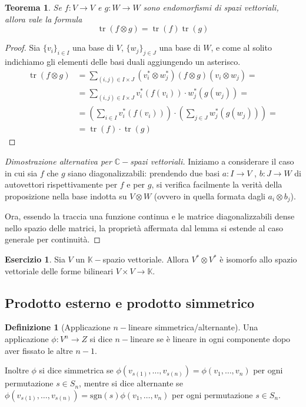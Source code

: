 \documentclass[11pt]{article}
\theoremstyle{plain}
\newtheorem{thm}{Teorema}[section]
\theoremstyle{definition}
\newtheorem{defn}{Definizione}[section]
\newtheorem{exercise}{Esercizio}[section]
\theoremstyle{remark}
\newcommand{\C}{\mathbb{C}}
\newcommand{\K}{\mathbb{K}}
\DeclareMathOperator{\tr}{tr}
\begin{document}
\begin{thm}
Se $f:V\to V$ e $g:W\to W$ sono endomorfismi di spazi vettoriali, allora vale la formula
\[\tr(f\otimes g) = \tr(f) \tr(g)  \]
\label{thm: tracciaprodotto}
\end{thm}
\begin{proof}
Sia $\{v_i\}_{i\in I}$ una base di $V$, $\{w_j\}_{j\in J}$ una base di $W$, e come al solito indichiamo gli elementi delle basi duali aggiungendo un asterisco.
\begin{align*}
 \tr(f\otimes g) &= \sum_{(i,j)\in I\times J} (v_i^*\otimes w_j^*) (f\otimes g)(v_i\otimes w_j) =\\
                 &= \sum_{(i,j)\in I\times J} v_i^*(f(v_i))\cdot w_j^*(g(w_j)) =\\
                 &= \left(\sum_{i\in I} v_i^*(f(v_i))\right) \cdot \left(\sum_{j\in J} w_j^*(g(w_j))\right) =\\
                 &= \tr(f) \cdot \tr(g)
\end{align*}
\end{proof}
\begin{proof}[Dimostrazione alternativa per $\C-$spazi vettoriali]
Iniziamo a considerare il caso in cui sia $f$ che $g$ siano diagonalizzabili: prendendo due basi $a:I\rightarrow V$ , $b:J\rightarrow W$ di autovettori rispettivamente per $f$ e per $g$, si verifica facilmente la verità della proposizione nella base indotta su $V\otimes W$ (ovvero in quella formata dagli $a_i\otimes b_j$).

Ora, essendo la traccia una funzione continua e le matrice diagonalizzabili dense nello spazio delle matrici, la proprietà affermata dal lemma si estende al caso generale per continuità.
\end{proof}

\begin{exercise}
Sia $V$ un $\K-$spazio vettoriale. Allora $V^*\otimes V^*$ è isomorfo allo spazio vettoriale delle forme bilineari $V\times V\to \K$.
\end{exercise}


\subsection{Prodotto esterno e prodotto simmetrico}

\begin{defn}[Applicazione $n-$lineare simmetrica/alternante]
 Una applicazione $\phi: V^n \to Z$ si dice $n-$lineare se è lineare in ogni componente dopo aver fissato le altre $n-1$.

 Inoltre $\phi$ si dice simmetrica se $\phi(v_{s(1)},\ldots,v_{s(n)})=\phi(v_1,\ldots,v_n)$ per ogni permutazione $s \in S_n$, mentre si dice
 alternante se $\phi(v_{s(1)},\ldots,v_{s(n)})=\mathrm{sgn}(s)\phi(v_1,\ldots,v_n)$ per ogni permutazione $s \in S_n$.
\end{defn}
\end{document}
